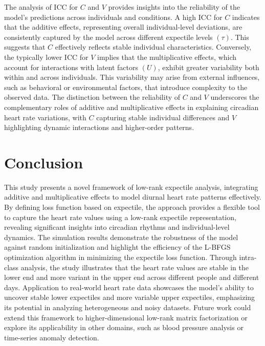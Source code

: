 \documentclass{article}
\begin{document}
The analysis of ICC for $C$ and $V$ provides insights into the reliability of the model's predictions across individuals and conditions. A high ICC for $C$ indicates that the additive effects, representing overall individual-level deviations, are consistently captured by the model across different expectile levels $(\tau)$. This suggests that $C$ effectively reflects stable individual characteristics. Conversely, the typically lower ICC for $V$ implies that the multiplicative effects, which account for interactions with latent factors $(U)$, exhibit greater variability both within and across individuals. This variability may arise from external influences, such as behavioral or environmental factors, that introduce complexity to the observed data. The distinction between the reliability of $C$ and $V$ underscores the complementary roles of additive and multiplicative effects in explaining circadian heart rate variations, with $C$ capturing stable individual differences and $V$ highlighting dynamic interactions and higher-order patterns.

\section{Conclusion}
This study presents a novel framework of low-rank expectile analysis, integrating additive and multiplicative effects to model diurnal heart rate patterns effectively. By defining loss function based on expectile, the approach provides a flexible tool to capture the heart rate values using a low-rank expectile representation, revealing significant insights into circadian rhythms and individual-level dynamics. The simulation results demonstrate the robustness of the model against random initialization and highlight the efficiency of the L-BFGS optimization algorithm in minimizing the expectile loss function. Through intra-class analysis, the study illustrates that the heart rate values are stable in the lower end and more variant in the upper end across different people and different days. Application to real-world heart rate data showcases the model's ability to uncover stable lower expectiles and more variable upper expectiles, emphasizing its potential in analyzing heterogeneous and noisy datasets. Future work could extend this framework to higher-dimensional low-rank matrix factorization or explore its applicability in other domains, such as blood pressure analysis or time-series anomaly detection. 

\clearpage



\end{document}
